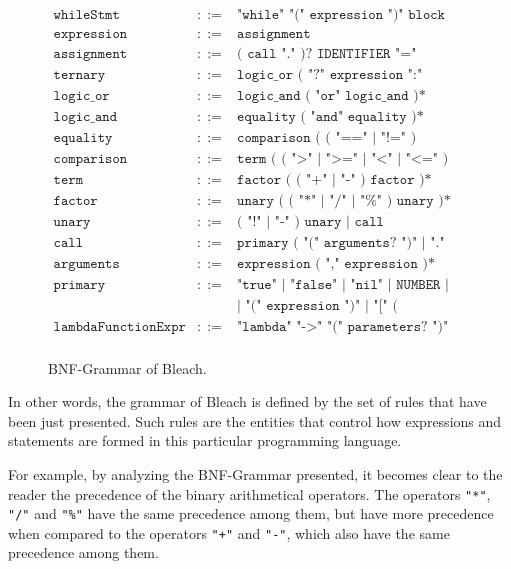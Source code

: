 \begin{figure}
{\[\begin{array}{rcl}
\texttt{whileStmt} & ::= & \texttt{"while" "(" expression ")" block} \\[1pt]
\texttt{expression} & ::= & \texttt{assignment} \\[1pt]
\texttt{assignment} & ::= & \texttt{( call "." )? IDENTIFIER "=" assignment | ternary} \\[1pt]
\texttt{ternary} & ::= & \texttt{logic\_or ( "?" expression ":" expression )*} \\[1pt]
\texttt{logic\_or} & ::= & \texttt{logic\_and ( "or" logic\_and )*} \\[1pt]
\texttt{logic\_and} & ::= & \texttt{equality ( "and" equality )*} \\[1pt]
\texttt{equality} & ::= & \texttt{comparison ( ( "==" | "!=" ) comparison )*} \\[1pt]
\texttt{comparison} & ::= & \texttt{term ( ( ">" | ">=" | "<" | "<=" ) term )*} \\[1pt]
\texttt{term} & ::= & \texttt{factor ( ( "+" | "-" ) factor )*} \\[1pt]
\texttt{factor} & ::= & \texttt{unary ( ( "*" | "/" | "\%" ) unary )*} \\[1pt]
\texttt{unary} & ::= & \texttt{( "!" | "-" ) unary | call} \\[1pt]
\texttt{call} & ::= & \texttt{primary ( "(" arguments? ")" | "." IDENTIFIER )*} \\[1pt]
\texttt{arguments} & ::= & \texttt{expression ( "," expression )*} \\[1pt]
\texttt{primary} & ::= & \texttt{"true" | "false" | "nil" | NUMBER | STRING | IDENTIFIER | "super" "." IDENTIFIER }  \\[1pt]
\texttt{} &  & \texttt{| "(" expression ")" | "[" ( expression ( "," expression )* )? "]"} \\[1pt]
\texttt{lambdaFunctionExpr} & ::= & \texttt{"lambda" "->"  "(" parameters? ")" block} \\[1pt]
\end{array}
\]
}
    \caption{BNF-Grammar of Bleach.}
    \label{fig:enter-label}
\end{figure}



\newpage

In other words, the grammar of Bleach is defined by the set of rules that have been just presented. Such rules are the entities that control how expressions and statements are formed in this particular programming language.

For example, by analyzing the BNF-Grammar presented, it becomes clear to the reader the precedence of the binary arithmetical operators. The operators \texttt{"*"}, \texttt{"/"} and \texttt{"\%"} have the same precedence among them, but have more precedence when compared to the operators \texttt{"+"} and \texttt{"-"}, which also have the same precedence among them.

